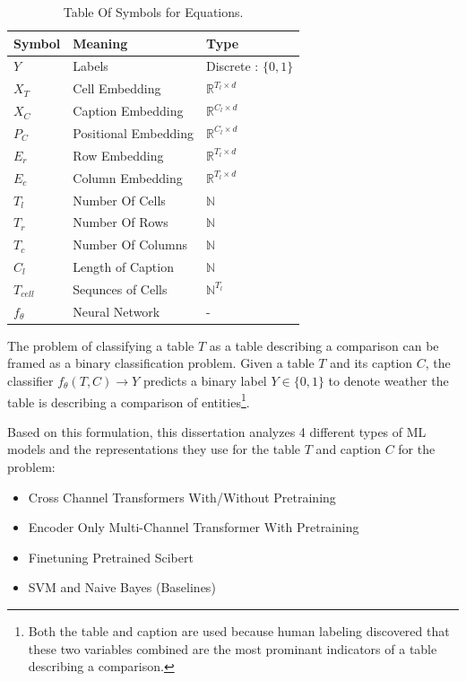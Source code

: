 \begin{table}
    \label{table\arabic{tablecounter}}
    \centering
    \begin{tabular}{|l|l|l|}
        \hline
        Symbol & Meaning & Type \\ \hline
        $Y$ & Labels & Discrete : $\{0,1\}$ \\ \hline
        $X_T$ & Cell Embedding & $\mathbb{R}^{T_l \times d}$\\ \hline
        $X_C$ & Caption Embedding & $\mathbb{R}^{C_l \times d}$ \\ \hline
        $P_C$ & Positional Embedding & $\mathbb{R}^{C_l \times d}$ \\ \hline
        $E_r$ & Row Embedding & $\mathbb{R}^{T_l \times d}$ \\ \hline
        $E_c$ & Column Embedding & $\mathbb{R}^{T_l \times d}$ \\ \hline
        $T_l$ & Number Of Cells & $\mathbb{N}$ \\ \hline
        $T_r$ & Number Of Rows & $\mathbb{N}$ \\ \hline
        $T_c$ & Number Of Columns & $\mathbb{N}$ \\ \hline
        $C_l$ & Length of Caption & $\mathbb{N}$ \\ \hline
        $T_{cell}$ & Sequnces of Cells & $\mathbb{N}^{T_l}$ \\ \hline
        $f_\theta$ & Neural Network & - \\ \hline
    \end{tabular}
    \caption{\label{tablecounter} Table Of Symbols for Equations. }
\end{table}
The problem of classifying a table $T$ as a table describing a comparison can be framed as a binary classification problem. Given a table $T$ and its caption $C$, the classifier $f_\theta(T,C) \rightarrow Y$ predicts a binary label $Y \in \{0,1\}$ to denote weather the table is describing a comparison of entities\footnote{Both the table and caption are used because human labeling discovered that these two variables combined are the most prominant indicators of a table describing a comparison.}. 

Based on this formulation, this dissertation analyzes 4 different types of ML models and the representations they use for the table $T$ and caption $C$ for the problem:
\begin{itemize}
    \item Cross Channel Transformers With/Without Pretraining
    \item Encoder Only Multi-Channel Transformer With Pretraining
    \item Finetuning Pretrained Scibert
    \item SVM and Naive Bayes (Baselines)
\end{itemize}

